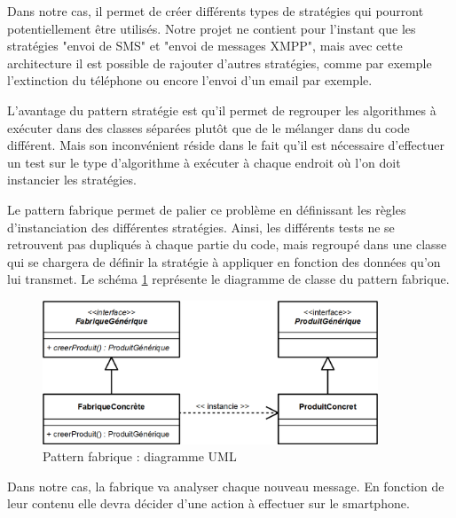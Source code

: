 Dans notre cas, il permet de créer différents types de stratégies qui pourront potentiellement être utilisés.
Notre projet ne contient pour l'instant que les stratégies "envoi de SMS" et "envoi de messages XMPP", mais avec cette architecture il est possible de rajouter d'autres stratégies, comme par exemple l'extinction du téléphone ou encore l'envoi d'un email par exemple.
\\



L'avantage du pattern stratégie est qu'il permet de regrouper les algorithmes à exécuter dans des classes séparées plutôt que de le mélanger dans du code différent.
Mais son inconvénient réside dans le fait qu'il est nécessaire d'effectuer un test sur le type d'algorithme à exécuter à chaque endroit où l'on doit instancier les stratégies.

Le pattern fabrique permet de palier ce problème en définissant les règles d'instanciation des différentes stratégies.
Ainsi, les différents tests ne se retrouvent pas dupliqués à chaque partie du code, mais regroupé dans une classe qui se chargera de définir la stratégie à appliquer en fonction des données qu'on lui transmet.
Le schéma \ref{pattern_fabrique} représente le diagramme de classe du pattern fabrique.
 
\begin{figure}[H]
  \center
  \includegraphics[width=10cm]{img/pattern_fabrique.png}
  \caption{Pattern fabrique : diagramme UML}
  \label{pattern_fabrique}
\end{figure}
 
Dans notre cas, la fabrique va analyser chaque nouveau message.
En fonction de leur contenu elle devra décider d'une action à effectuer sur le smartphone.
\\



